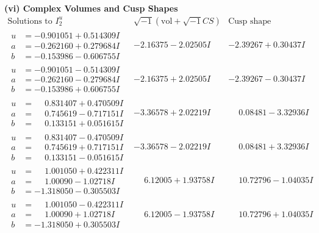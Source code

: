 \documentclass[1p]{elsarticle_modified}
\theoremstyle{definition}
\newcommand{\I}{\sqrt{-1}}
\begin{document}
\newpage\flushleft \textbf{(vi) Complex Volumes and Cusp Shapes}
$$\begin{array}{c|c|c}  
\text{Solutions to }I^u_{2}& \I (\text{vol} + \sqrt{-1}CS) & \text{Cusp shape}\\
 \hline 
\begin{aligned}
u &= -0.901051 + 0.514309 I \\
a &= -0.262160 + 0.279684 I \\
b &= -0.153986 - 0.606755 I\end{aligned}
 & -2.16375 - 2.02505 I & -2.39267 + 0.30437 I \\ \hline\begin{aligned}
u &= -0.901051 - 0.514309 I \\
a &= -0.262160 - 0.279684 I \\
b &= -0.153986 + 0.606755 I\end{aligned}
 & -2.16375 + 2.02505 I & -2.39267 - 0.30437 I \\ \hline\begin{aligned}
u &= \phantom{-}0.831407 + 0.470509 I \\
a &= \phantom{-}0.745619 - 0.717151 I \\
b &= \phantom{-}0.133151 + 0.051615 I\end{aligned}
 & -3.36578 + 2.02219 I & \phantom{-}0.08481 - 3.32936 I \\ \hline\begin{aligned}
u &= \phantom{-}0.831407 - 0.470509 I \\
a &= \phantom{-}0.745619 + 0.717151 I \\
b &= \phantom{-}0.133151 - 0.051615 I\end{aligned}
 & -3.36578 - 2.02219 I & \phantom{-}0.08481 + 3.32936 I \\ \hline\begin{aligned}
u &= \phantom{-}1.001050 + 0.422311 I \\
a &= \phantom{-}1.00090 - 1.02718 I \\
b &= -1.318050 - 0.305503 I\end{aligned}
 & \phantom{-}6.12005 + 1.93758 I & \phantom{-}10.72796 - 1.04035 I \\ \hline\begin{aligned}
u &= \phantom{-}1.001050 - 0.422311 I \\
a &= \phantom{-}1.00090 + 1.02718 I \\
b &= -1.318050 + 0.305503 I\end{aligned}
 & \phantom{-}6.12005 - 1.93758 I & \phantom{-}10.72796 + 1.04035 I \\ \hline\begin{aligned}

\end{aligned}
\end{array}$$
\end{document}
